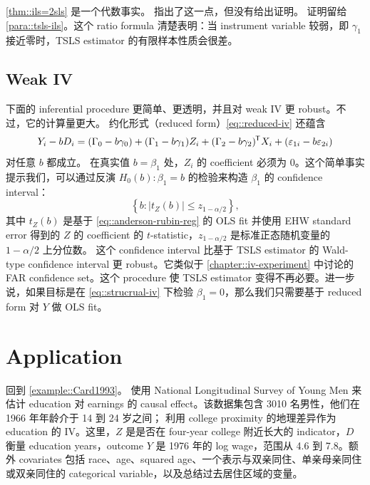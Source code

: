 \cref{thm::ils=2sls} 是一个代数事实。
\citet[][Section A.3]{imbens2014instrumental} 指出了这一点，但没有给出证明。
证明留给 \cref{para::tsls-ils}。这个 ratio formula 清楚表明：当 instrument variable 较弱，即 $\gamma_1 $ 接近零时，TSLS estimator 的有限样本性质会很差。 



\subsection{Weak IV}

下面的 inferential procedure 更简单、更透明，并且对 weak IV 更 robust。不过，它的计算量更大。
约化形式（reduced form）\cref{eq::reduced-iv} 还蕴含
\begin{eqnarray}
\label{eq::anderson-rubin-reg}
Y_i  - bD_i = (\Gamma_0 -b \gamma_0 ) +  (\Gamma_1  - b \gamma_1 ) Z_i
+ (\Gamma_2 - b \gamma_2  ) ^{\mkern-1.5mu\mathsf{T}} X_i  + ( \varepsilon_{1i} -  b \varepsilon_{2i} )
\end{eqnarray}
对任意 $b$ 都成立。
在真实值 $b = \beta_1$ 处，$Z_i$ 的 coefficient 必须为 $0$。这个简单事实提示我们，可以通过反演 $H_0(b): \beta_1 = b$ 的检验来构造 $\beta_1$ 的 confidence interval：
$$
\left\{ b:  | t_Z(b) | \leq z_{1-\alpha/2} \right\},
$$
其中 $t_Z(b) $ 是基于 \cref{eq::anderson-rubin-reg} 的 OLS fit 并使用 EHW standard error 得到的 $Z$ 的 coefficient 的 $t$-statistic，$z_{1-\alpha/2}$ 是标准正态随机变量的 $1-\alpha/2$ 上分位数。
这个 confidence interval 比基于 TSLS estimator 的 Wald-type confidence interval 更 robust。它类似于 \cref{chapter::iv-experiment} 中讨论的 FAR confidence set。这个 procedure 使 TSLS estimator 变得不再必要。进一步说，如果目标是在 \cref{eq::strucrual-iv} 下检验 $\beta_1 = 0$，那么我们只需要基于 reduced form 对 $Y$ 做 OLS fit。 



\section{Application}\label{sec::tsls-application}

 

回到 \cref{example::Card1993}。
\citet{card1993using} 使用 National Longitudinal Survey of Young Men 来估计 education 对 earnings 的 causal effect。该数据集包含 3010 名男性，他们在 1966 年年龄介于 14 到 24 岁之间；\citet{card1993using} 利用 college proximity 的地理差异作为 education 的 IV。这里，$Z$ 是是否在 four-year college 附近长大的 indicator，$D$ 衡量 education years，outcome $Y$ 是 1976 年的 log wage，范围从 4.6 到 7.8。额外 covariates 包括 race、age、squared age、一个表示与双亲同住、单亲母亲同住或双亲同住的 categorical variable，以及总结过去居住区域的变量。 



